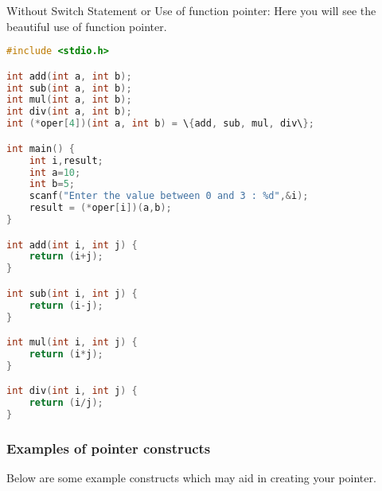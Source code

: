 Without Switch Statement or Use of function pointer: Here you will see the
beautiful use of function pointer.
\lstset{basicstyle=\scriptsize, numbers=left, captionpos=b, tabsize=4}
\begin{lstlisting}[caption=Section \thesection listing \arabic{pntcnt},language={C},
breaklines=true,xleftmargin=15pt,label=lst:section\thesection listing\arabic{pntcnt}]
#include <stdio.h>

int add(int a, int b);
int sub(int a, int b);
int mul(int a, int b);
int div(int a, int b);
int (*oper[4])(int a, int b) = \{add, sub, mul, div\};

int main() {
	int i,result;
	int a=10;
	int b=5;
	scanf("Enter the value between 0 and 3 : %d",&i); 
	result = (*oper[i])(a,b);
}

int add(int i, int j) {
	return (i+j);
}

int sub(int i, int j) {
	return (i-j);
}

int mul(int i, int j) {
	return (i*j);
}

int div(int i, int j) {
	return (i/j);
}
\end{lstlisting}

\subsubsection{Examples of pointer constructs}
Below are some example constructs which may aid in creating your pointer.

